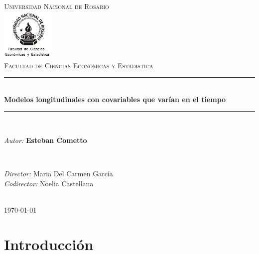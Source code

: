 \documentclass[12pt]{article}
\title{\thesistitle}
\author{\thesisauthorfirst\space\thesisauthorsecond}
\date{\thesisdate}
\def\thesistitle{Modelos longitudinales con covariables que varían en el tiempo}
\def\thesisauthorfirst{\textbf{Esteban Cometto}}
\def\thesissupervisorfirst{Maria Del Carmen García}
\def\thesissupervisorsecond{Noelia Castellana}
\def\thesisdate{\today}
\begin{document}
\begin{titlepage}
    \newcommand{\HRule}{\rule{\linewidth}{0.5mm}}
	\center
	\textsc{\Large Universidad Nacional de Rosario}\\[.7cm]
	\includegraphics[width=25mm]{img/fceye-unr.png}\\[.5cm]
	\textsc{Facultad de Ciencias Económicas y Estadística}\\[0.5cm]
	
	\HRule \\[0.4cm]
	{ \huge \bfseries \thesistitle}\\[0.1cm]
	\HRule \\[.5cm]
	
	\begin{minipage}{0.6\textwidth}
	\large
	\emph{Autor:}	\thesisauthorfirst
	\end{minipage}
	\\[.6cm]
	\begin{minipage}{0.6\textwidth}
	\emph{Director:} 	\thesissupervisorfirst \\[.2cm]
	\emph{Codirector:} 	\thesissupervisorsecond
	\end{minipage}
	\\[4cm]
	\vfill
	{\large \thesisdate}\\
	\clearpage
\end{titlepage}

\newpage
\tableofcontents

\newpage
\section{Introducción}
\end{document}

